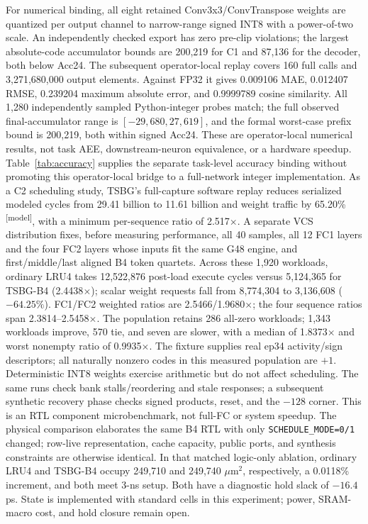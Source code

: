 \documentclass[conference]{IEEEtran}
\newcommand{\modeltag}{\textsuperscript{[model]}}
\begin{document}
For numerical binding, all eight retained Conv3x3/ConvTranspose weights are
quantized per output channel to narrow-range signed INT8 with a power-of-two
scale.  An independently checked export has zero pre-clip violations; the
largest absolute-code accumulator bounds are 200,219 for C1 and 87,136 for the
decoder, both below Acc24.  The subsequent operator-local replay covers 160
full calls and 3,271,680,000 output elements.  Against FP32 it gives 0.009106
MAE, 0.012407 RMSE, 0.239204 maximum absolute error, and 0.9999789 cosine
similarity.  All 1,280 independently sampled Python-integer probes match;
the full observed final-accumulator range is $[-29{,}680,27{,}619]$, and the
formal worst-case prefix bound is 200,219, both within signed Acc24.  These are
operator-local numerical results, not task AEE, downstream-neuron equivalence,
or a hardware speedup.  Table~\ref{tab:accuracy} supplies the separate task-level
accuracy binding without promoting this operator-local bridge to a full-network
integer implementation.
As a C2 scheduling study, TSBG's full-capture software replay reduces serialized
modeled cycles from 29.41 billion to 11.61 billion and weight traffic by
65.20\%\modeltag, with a minimum per-sequence ratio of 2.517$\times$.  A
separate VCS distribution fixes, before measuring performance, all 40 samples,
all 12 FC1 layers and the four FC2 layers whose inputs fit the same G48 engine,
and first/middle/last aligned B4 token quartets.  Across these 1,920 workloads,
ordinary LRU4 takes 12,522,876 post-load execute cycles versus 5,124,365 for
TSBG-B4 (2.4438$\times$); scalar weight requests fall from 8,774,304 to
3,136,608 ($-64.25\%$).  FC1/FC2 weighted ratios are 2.5466/1.9680$\times$;
the four sequence ratios span 2.3814--2.5458$\times$.  The population retains
286 all-zero workloads; 1,343 workloads improve, 570 tie, and seven are slower,
with a median of 1.8373$\times$ and worst nonempty ratio of 0.9935$\times$.
The fixture supplies real ep34 activity/sign descriptors; all naturally
nonzero codes in this measured population are $+1$.
Deterministic INT8 weights exercise arithmetic but do not affect scheduling.
The same runs check bank stalls/reordering and stale responses; a subsequent
synthetic recovery phase checks signed products, reset, and the $-128$ corner.  This is
an RTL component microbenchmark, not full-FC or system speedup.  The physical
comparison elaborates the same B4 RTL with only
\texttt{SCHEDULE\_MODE=0/1} changed; row-live representation, cache capacity,
public ports, and synthesis constraints are otherwise identical.
In that matched logic-only ablation, ordinary LRU4 and TSBG-B4 occupy
249,710 and 249,740 $\mu$m$^2$, respectively, a 0.0118\% increment, and both
meet 3-ns setup.  Both have a diagnostic hold slack of $-16.4$ ps.  State is
implemented with standard cells in this experiment; power, SRAM-macro cost,
and hold closure remain open.
\end{document}
